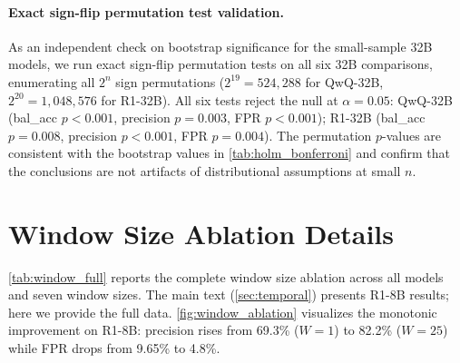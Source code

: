 \paragraph{Exact sign-flip permutation test validation.} As an independent check on bootstrap significance for the small-sample 32B models, we run exact sign-flip permutation tests on all six 32B comparisons, enumerating all $2^n$ sign permutations ($2^{19}{=}524{,}288$ for QwQ-32B, $2^{20}{=}1{,}048{,}576$ for R1-32B). All six tests reject the null at $\alpha{=}0.05$: QwQ-32B (bal\_acc $p{<}0.001$, precision $p{=}0.003$, FPR $p{<}0.001$); R1-32B (bal\_acc $p{=}0.008$, precision $p{<}0.001$, FPR $p{=}0.004$). The permutation $p$-values are consistent with the bootstrap values in \cref{tab:holm_bonferroni} and confirm that the conclusions are not artifacts of distributional assumptions at small $n$.


\section{Window Size Ablation Details}
\label{app:window_ablation}

\cref{tab:window_full} reports the complete window size ablation across all models and seven window sizes. The main text (\cref{sec:temporal}) presents R1-8B results; here we provide the full data. \cref{fig:window_ablation} visualizes the monotonic improvement on R1-8B: precision rises from 69.3\% ($W{=}1$) to 82.2\% ($W{=}25$) while FPR drops from 9.65\% to 4.8\%.


